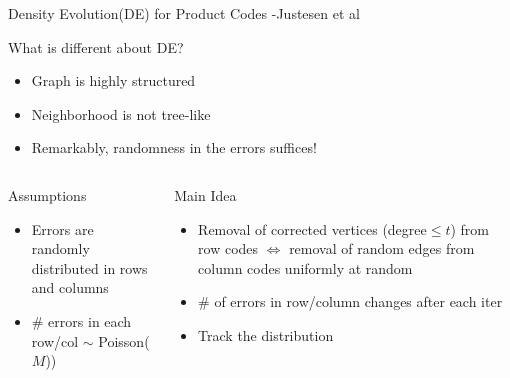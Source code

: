 \begin{frame}{Density Evolution(DE) for Product Codes -Justesen et al}

\begin{block}{What is different about DE?}
\begin{itemize}
\item Graph is highly structured
\item Neighborhood is not tree-like
\item Remarkably, randomness in the errors suffices!
\end{itemize}
\end{block}
\pause
   \begin{columns}
   	\begin{block}{Assumptions}
   		\begin{itemize}
   			\item Errors are \alert{randomly distributed} in rows and columns
   			\item \alert{\# errors} in each row/col $\sim$ \alert{Poisson}($M$))
   		\end{itemize}
   	\end{block}
   	\pause
   	\begin{block}{Main Idea}
   		\begin{itemize}
   			\item Removal of \alert{corrected vertices} (degree$\leq t$) from row codes $\Leftrightarrow$ removal of random edges from column codes uniformly at random
   			\item \# of errors in row/column changes after each iter
   				\item Track the distribution
   		\end{itemize}
   	\end{block}
   	 	

\end{columns}
\end{frame}
